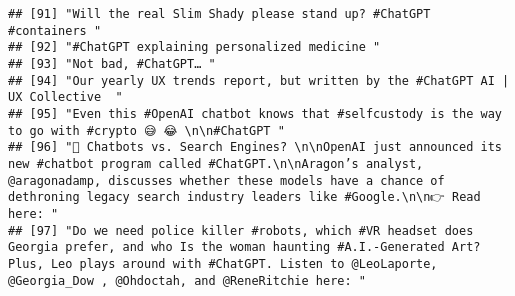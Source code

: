 \documentclass[
]{article}
\newenvironment{Shaded}{\begin{snugshade}}{\end{snugshade}}
\newcommand{\FunctionTok}[1]{\textcolor[rgb]{0.00,0.00,0.00}{#1}}
\newcommand{\NormalTok}[1]{#1}
\newcommand{\SpecialCharTok}[1]{\textcolor[rgb]{0.00,0.00,0.00}{#1}}
\newcommand{\StringTok}[1]{\textcolor[rgb]{0.31,0.60,0.02}{#1}}
\begin{document}
\begin{verbatim}
## [91] "Will the real Slim Shady please stand up? #ChatGPT #containers "                                                                                                                                                                                                                                               
## [92] "#ChatGPT explaining personalized medicine "                                                                                                                                                                                                                                                                    
## [93] "Not bad, #ChatGPT… "                                                                                                                                                                                                                                                                                           
## [94] "Our yearly UX trends report, but written by the #ChatGPT AI | UX Collective  "                                                                                                                                                                                                                                 
## [95] "Even this #OpenAI chatbot knows that #selfcustody is the way to go with #crypto 😅 😂 \n\n#ChatGPT "                                                                                                                                                                                                           
## [96] "🔎 Chatbots vs. Search Engines? \n\nOpenAI just announced its new #chatbot program called #ChatGPT.\n\nAragon’s analyst, @aragonadamp, discusses whether these models have a chance of dethroning legacy search industry leaders like #Google.\n\n👉 Read here: "                                              
## [97] "Do we need police killer #robots, which #VR headset does Georgia prefer, and who Is the woman haunting #A.I.-Generated Art? Plus, Leo plays around with #ChatGPT. Listen to @LeoLaporte, @Georgia_Dow , @Ohdoctah, and @ReneRitchie here: "
\end{verbatim}

\begin{Shaded}
\end{Shaded}
\end{document}
